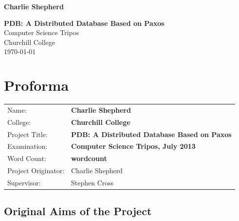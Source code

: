 \documentclass[12pt,twoside,notitlepage]{report}
\begin{document}





\pagestyle{empty}

\hfill{\LARGE \bf Charlie Shepherd}

\vspace*{60mm}
\begin{center}
\Huge
{\bf PDB: A Distributed Database Based on Paxos} \\
\vspace*{5mm}
Computer Science Tripos \\
\vspace*{5mm}
Churchill College \\
\vspace*{5mm}
\today  %
\end{center}

\cleardoublepage


\setcounter{page}{1}
\pagestyle{plain}

\chapter*{Proforma}

{\large
\begin{tabular}{ll}
Name:               & \bf Charlie Shepherd                        \\
College:            & \bf Churchill College                     \\
Project Title:      & \bf PDB: A Distributed Database Based on Paxos \\
Examination:        & \bf Computer Science Tripos, July 2013        \\
Word Count:         & \bf wordcount \\
Project Originator: & Charlie Shepherd                    \\
Supervisor:         & Stephen Cross                    \\
\end{tabular}
}


\section*{Original Aims of the Project}
\end{document}
